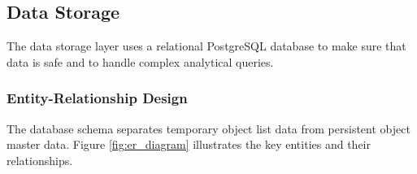 \subsection{Data Storage}
The data storage layer uses a relational PostgreSQL database to make sure that data is safe and to handle complex analytical queries.

\subsubsection{Entity-Relationship Design}
The database schema separates temporary object list data from persistent object master data.
Figure \ref{fig:er_diagram} illustrates the key entities and their relationships.


